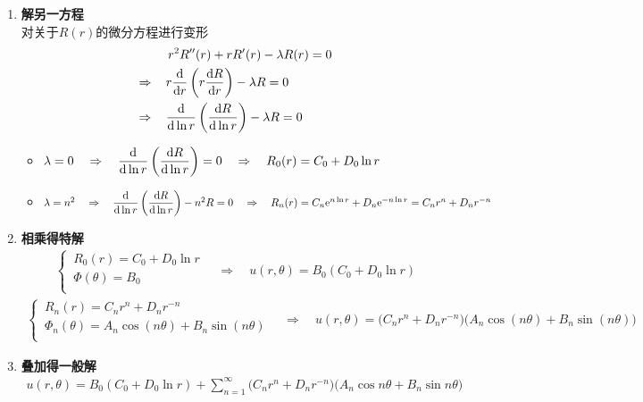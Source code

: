 \begin{enumerate}[\textbf{步骤}1 ]
	\item \textbf{解另一方程}\\
	对关于$R(r)$的微分方程进行变形
	\begin{align*}
		&\,\,\quad r^2 R''(r) + rR'(r) - \lambda R(r) = 0\\
		\Rightarrow & \,\quad r \dfrac{{\rm{d}} }{{\rm{d}} r}\left(r \dfrac{{\rm{d}} R}{{\rm{d}} r}\right) - \lambda R = 0\\
		\Rightarrow & \,\quad \dfrac{{\rm{d}} }{{\rm{d}} \ln r} \left(\dfrac{{\rm{d}} R}{{\rm{d}} \ln r}\right) - \lambda R = 0
	\end{align*}
	\begin{itemize}
		\item $\lambda = 0 \quad \Rightarrow \quad \dfrac{{\rm{d}} }{{\rm{d}} \ln r} \left(\dfrac{{\rm{d}} R}{{\rm{d}} \ln r}\right) = 0 \quad \Rightarrow \quad R_0(r) = C_0 + D_0 \ln r$
		\vspace*{0.5em}
		
		\item $\lambda = n^2 \quad \Rightarrow \quad \dfrac{{\rm{d}} }{{\rm{d}} \ln r} \left(\dfrac{{\rm{d}} R}{{\rm{d}} \ln r}\right) - n^2 R = 0 \quad \Rightarrow \quad R_n(r) = C_n {\rm{e}}^{n \ln r} + D_n {\rm{e}}^{-n \ln r} = C_n r^n + D_n r^{-n}$
	\end{itemize}
	
	\item \textbf{相乘得特解}
	\begin{align*}
		\begin{cases}
			\, R_0(r) = C_0 + D_0 \ln r\\
			\, \Phi(\theta) = B_0\\
		\end{cases}
		\quad \Rightarrow \quad u(r, \theta) = B_0(C_0 + D_0 \ln r)
	\end{align*}
	\vspace*{-1.5em}
	\begin{align*}
		\begin{cases}
			\, R_n(r) = C_n r^n + D_n r^{-n}\\
			\, \Phi_n(\theta) = A_n \cos(n\theta) + B_n \sin(n \theta)\\
		\end{cases}
		\quad \Rightarrow \quad u(r, \theta) = \big(C_n r^n + D_n r^{-n}\big)\big(A_n \cos(n\theta) + B_n \sin(n \theta)\big)
	\end{align*}
	
	\item \textbf{叠加得一般解}
	\begin{align}
		u(r, \theta) =  B_0(C_0 + D_0 \ln r) + \sum_{n = 1}^\infty \big(C_n r^n + D_n r^{-n}\big)\big(A_n \cos n\theta + B_n \sin n \theta \big)
	\end{align}
	

\end{enumerate}
